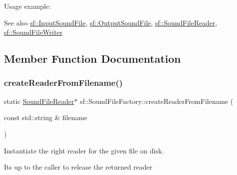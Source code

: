 Usage example\+: 
\begin{DoxyCode}{0}
\end{DoxyCode}


\begin{DoxySeeAlso}{See also}
\mbox{\hyperlink{classsf_1_1_input_sound_file}{sf\+::\+Input\+Sound\+File}}, \mbox{\hyperlink{classsf_1_1_output_sound_file}{sf\+::\+Output\+Sound\+File}}, \mbox{\hyperlink{classsf_1_1_sound_file_reader}{sf\+::\+Sound\+File\+Reader}}, \mbox{\hyperlink{classsf_1_1_sound_file_writer}{sf\+::\+Sound\+File\+Writer}} \begin{DoxyVerb}\end{DoxyVerb}
 
\end{DoxySeeAlso}


\subsection{Member Function Documentation}
\mbox{\label{classsf_1_1_sound_file_factory_af0a87110e0b8a77aada17b22a016c066}} 
\subsubsection{\texorpdfstring{createReaderFromFilename()}{createReaderFromFilename()}}
{\footnotesize\ttfamily static \mbox{\hyperlink{classsf_1_1_sound_file_reader}{Sound\+File\+Reader}}$\ast$ sf\+::\+Sound\+File\+Factory\+::create\+Reader\+From\+Filename (\begin{DoxyParamCaption}\item[{const std\+::string \&}]{filename }\end{DoxyParamCaption})\hspace{0.3cm}{\ttfamily [static]}}



Instantiate the right reader for the given file on disk. 

It\textquotesingle{}s up to the caller to release the returned reader


